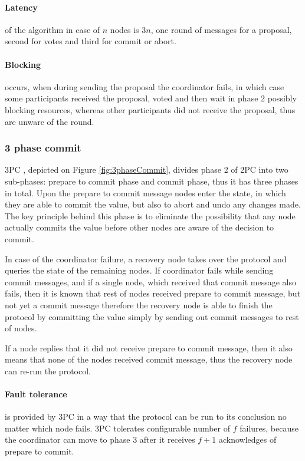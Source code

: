 \paragraph{Latency} of the algorithm in case of $n$ nodes is $3n$, one round of messages for a proposal, second for votes and third for commit or abort.

\paragraph{Blocking} occurs, when during sending the proposal the coordinator fails, in which case some participants received the proposal, voted and then wait in phase 2 possibly blocking resources, whereas other participants did not receive the proposal, thus are unware of the round.





\subsubsection{3 phase commit}\label{sec:theory:transactions:3pc}
3PC \cite{3phaseC}, depicted on Figure \ref{fig:3phaseCommit}, divides phase 2 of 2PC into two sub-phases: prepare to commit phase and commit phase, thus it has three phases in total. Upon the prepare to commit message nodes enter the state, in which they are able to commit the value, but also to abort and undo any changes made. The key principle behind this phase is to eliminate the possibility that any node actually commits the value before other nodes are aware of the decision to commit.

In case of the coordinator failure, a recovery node takes over the protocol and queries the state of the remaining nodes. If coordinator fails while sending commit messages, and if a single node, which received that commit message also fails, then it is known that rest of nodes received prepare to commit message, but not yet a commit message therefore the recovery node is able to finish the protocol by committing the value simply by sending out commit messages to rest of nodes. 

If a node replies that it did not receive prepare to commit message, then it also means that none of the nodes received commit message, thus the recovery node can re-run the protocol. 

\paragraph{Fault tolerance} is provided by 3PC in a way that the protocol can be run to its conclusion no matter which node fails. 3PC tolerates configurable number of $f$ failures, because the coordinator can move to phase 3 after it receives $f+1$ acknowledges of prepare to commit.

